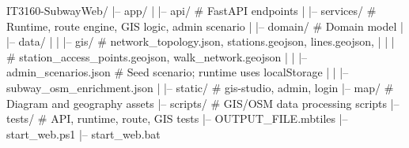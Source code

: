IT3160-SubwayWeb/
|-- app/
|   |-- api/                # FastAPI endpoints
|   |-- services/           # Runtime, route engine, GIS logic, admin scenario
|   |-- domain/             # Domain model
|   |-- data/
|   |   |-- gis/            # network_topology.json, stations.geojson, lines.geojson,
|   |   |                   # station_access_points.geojson, walk_network.geojson
|   |   |-- admin_scenarios.json      # Seed scenario; runtime uses localStorage
|   |   |-- subway_osm_enrichment.json
|   |-- static/             # gis-studio, admin, login
|-- map/                    # Diagram and geography assets
|-- scripts/                # GIS/OSM data processing scripts
|-- tests/                  # API, runtime, route, GIS tests
|-- OUTPUT_FILE.mbtiles
|-- start_web.ps1
|-- start_web.bat
